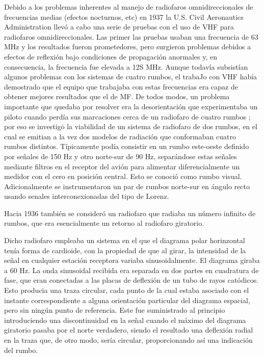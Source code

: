 Debido a los problemas inherentes al manejo de radiofaros omnidireccionales de frecuencias medias (efectos nocturnos, etc) en 1937 la U.S. Civil Aeronautics Administration llevó a cabo una serie de pruebas con el uso de VHF para radiofaros omnidireccionales. Las primer las pruebas usaban una frecuencia de 63 MHz y los resultados fueron prometedores, pero surgieron problemas debidos a efectos de reflexión bajo condiciones de propagaci\'on anormales y, en consecuencia, la frecuencia fue elevada a 12S MHz. Aunque todavía subsistían algunos problemas con los sistemas de cuatro rumbos, el trabaJo con VHF había demostrado que el equipo que trabajaba con estas frecuencias era capaz de obtener mejores resultados que el de MF. De todos modos, un problema importante que quedaba por resolver era la desorientación que experimentaba un piloto cuando perdía sus marcaciones cerca de un radiofaro de cuatro rumbos ; por eso se investigȯ la viabilidad de un sistema de radiofaro de dos rumbos, en el cual se emitian a la vez dos modelos de radiación que conformaban cuatro rumbos distintos. Típicamente podía consistir en un rumbo este-oeste definido por señales de 150 Hz y otro norte-sur de 90 Hz, separándose estas señales mediante filtros en el receptor del avión para alimentar diferencialmente un medidor con el cero en posición central. Esto se conoció como rumbo visual. Adicionalmente se instrumentaron un par de rumbos norte-sur en ángulo recto usando senales interconexionadas del tipo de Lorenz.%

Hacia 1936 tambi\'en se consideró un radiofaro que radiaba un n\'umero infinito de rumbos, que era esencialmente un retorno al radiofaro giratorio.

Dicho radiofaro empleaba un sistema en el que el diagrama polar horinzontal tenía forma de cardioide, con la propiedad de que al girar, la intensidad de la señal en cualquier estación receptora variaba sinusoidalmente. El diagrama giraba a 60 Hz. La onda sinusoidal recibida era separada en dos partes en cuadratura de fase, que eran conectadas a las placas
de deflexión de un tubo de rayos catódicos. Esto producia una traza
circular, cada punto de la cual estaba asociado con el instante correspondiente a 
alguna orientaci\'on particular del diagrama espacial, pero sin
ningún punto de referencia. Este fue suministrado al principio introduciendo una discontinuidad en la se\~nal cuando el m\'aximo del diagrama
giratorio pasaba por el norte verdadero, siendo el resultado una deflexi\'on radial en la traza que,
 de otro modo, sería circular, proporcionando así una indicación del rumbo. 

